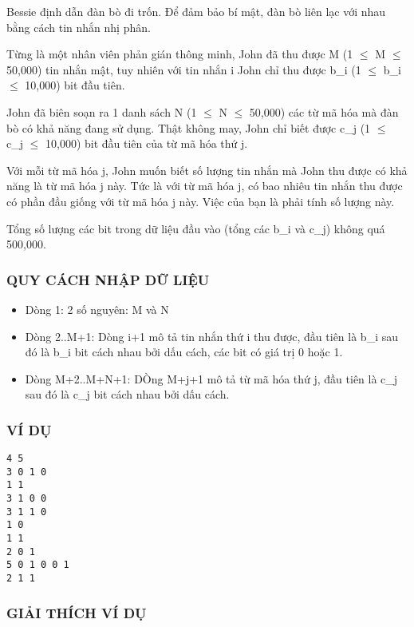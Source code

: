 



   Bessie định dẫn đàn bò đi trốn. Để đảm bảo bí mật, đàn bò liên lạc với nhau bằng cách tin nhắn nhị phân.  

   Từng là một nhân viên phản gián thông minh, John đã thu được M  (1  $\le$  M  $\le$  50,000) tin nhắn mật, tuy nhiên với tin nhắn i John chỉ  thu được b\_i (1  $\le$  b\_i  $\le$  10,000) bit đầu tiên.  

   John đã biên soạn ra 1 danh sách N (1  $\le$  N  $\le$  50,000) các từ mã hóa mà đàn bò có khả năng đang sử dụng. Thật không may, John chỉ biết  được c\_j (1  $\le$  c\_j  $\le$  10,000) bit đầu tiên của từ mã hóa thứ j.  

   Với mỗi từ mã hóa j, John muốn biết số lượng tin nhắn mà John  thu được có khả năng là từ mã hóa j này. Tức là với từ mã hóa j, có bao  nhiêu tin nhắn thu được có phần đầu giống với từ mã hóa j này. Việc  của bạn là phải tính số lượng này.  

   Tổng số lượng các bit trong dữ liệu đầu vào (tổng các b\_i và c\_j) không quá 500,000.  

\subsubsection{   QUY CÁCH NHẬP DỮ LIỆU  }
\begin{itemize}
	\item     Dòng 1: 2 số nguyên: M và N   
	\item     Dòng 2..M+1: Dòng i+1 mô tả tin nhắn thứ i thu được, đầu tiên là b\_i         sau đó là b\_i bit cách nhau bởi dấu cách, các bit có giá trị 0 hoặc 1.   
	\item     Dòng M+2..M+N+1: DÒng M+j+1 mô tả từ mã hóa thứ j, đầu tiên là c\_j         sau đó là c\_j bit cách nhau bởi dấu cách.   
\end{itemize}

\subsubsection{   VÍ DỤ  }
\begin{verbatim}
4 5
3 0 1 0
1 1
3 1 0 0
3 1 1 0
1 0
1 1
2 0 1
5 0 1 0 0 1
2 1 1
\end{verbatim}

\subsubsection{   GIẢI THÍCH VÍ DỤ  }

